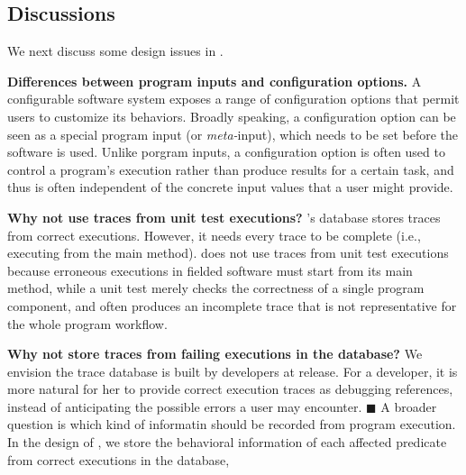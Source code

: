 \subsection{Discussions}

We next discuss some design issues in \ourtool.

\vspace{1mm}
\noindent \textbf{Differences between program inputs and configuration options.}
A configurable software system exposes a range of configuration
options that permit users to
customize its behaviors. Broadly speaking,
a configuration option can be seen as a special program input
(or \textit{meta-}input), which needs to be set before the
software is used. Unlike porgram inputs, a configuration option is often
used to control a program's execution rather than
produce results for a certain task, and thus
is often independent of the concrete input values that a user might provide.


\vspace{1mm}
\noindent \textbf{Why not use traces from unit test executions?}
\ourtool's database stores traces from correct 
executions. However, it needs every trace to be complete
(i.e., executing from the main method).
\ourtool does not use traces from unit test executions
because erroneous executions
in fielded software must start from its main method, while
a unit test merely checks the correctness
of a single program component, and often produces
an incomplete trace that is not representative for
the whole program workflow. 



\vspace{1mm}
\noindent \textbf{Why not store traces from failing executions in the database?}
We envision the trace database is built by developers at release.
For a developer, it is more natural for her to provide correct execution
traces as debugging references, instead of
anticipating the possible errors a user may encounter.
$\blacksquare$
A broader question is which kind of informatin should be recorded
from program execution. 
In the design of \ourtool, we store the behavioral information
of each affected predicate from correct executions in the database,


